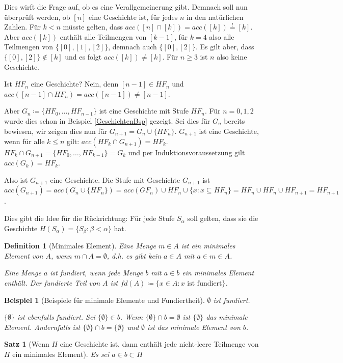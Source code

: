 \documentclass[german]{article}
\theoremstyle{break}
\newtheorem{example}{Beispiel}
\theoremstyle{def_style}
\newtheorem{definition}{Definition}
\theoremstyle{def_style}
\newtheorem{satz}{Satz}
\begin{document}
Dies wirft die Frage auf, ob es eine Verallgemeinerung gibt. Demnach soll nun überprüft werden, ob $[n]$ eine Geschichte ist, für jedes $n$ in den natürlichen Zahlen. Für $k<n$ müsste gelten, dass $acc([n]\cap[k])=acc([k])\stackrel{!}{=}[k]$. 
Aber $acc([k])$ enthält alle Teilmengen von $[k-1]$, für $k=4$ also alle Teilmengen von $\{[0],[1],[2]\}$, demnach auch $\{[0], [2]\}$. Es gilt aber, dass $\{[0],[2]\}\notin [k]$ und es folgt $acc([k])\neq[k]$. Für $n \geq 3$ ist $n$ also keine Geschichte.

Ist $HF_n$ eine Geschichte? Nein, denn $[n-1]\in HF_n$ und $acc([n-1]\cap HF_n)=acc([n-1])\neq[n-1]$.

Aber $G_n\coloneqq\{HF_0,\dots,HF_{n-1}\}$ ist eine Geschichte mit Stufe $HF_n$. Für $n=0,1,2$ wurde dies schon in Beispiel \ref{GeschichtenBsp} gezeigt. Sei dies für $G_n$ bereits bewiesen, wir zeigen dies nun für $G_{n+1}=G_n\cup\{HF_n\}$.
$G_{n+1}$ ist eine Geschichte, wenn für alle $k \leq n$ gilt: $acc(HF_k\cap G_{n+1})=HF_k$.
$HF_k \cap G_{n+1} = \{HF_0,\dots,HF_{k-1}\}=G_k$ und per Induktionsvoraussetzung gilt $acc(G_k)=HF_k$.

Also ist $G_{n+1}$ eine Geschichte. Die Stufe mit Geschichte $G_{n+1}$ ist $acc(G_{n+1})=acc(G_n\cup \{HF_n\})=acc(GF_n)\cup HF_n \cup \{x : x\subseteq HF_n\}=HF_n\cup HF_n \cup HF_{n+1} = HF_{n+1}$.

Dies gibt die Idee für die Rückrichtung: Für jede Stufe $S_\alpha$ soll gelten, dass sie die Geschichte $H(S_\alpha)=\{S_\beta : \beta < \alpha\}$ hat.

\begin{definition}[Minimales Element]
	Eine Menge $m\in A$ ist ein \textit{minimales Element} von $A$, wenn $m\cap A=\emptyset$, d.h. es gibt kein $a\in A$ mit $a\in m \in A$.
	
	Eine Menge $a$ ist fundiert, wenn jede Menge $b$ mit $a\in b$ ein minimales Element enthält. Der fundierte Teil von $A$ ist $fd(A)\coloneqq\{x\in A : x \text{ ist fundiert}\}$.
\end{definition}

\begin{example}[Beispiele für minimale Elemente und Fundiertheit]
	$\emptyset$ ist fundiert.
	
	$\{\emptyset\}$ ist ebenfalls fundiert. Sei $\{\emptyset\}\in b$. Wenn $\{\emptyset\}\cap b =\emptyset$ ist $\{\emptyset\}$ das minimale Element. Andernfalls ist $\{\emptyset\}\cap b=\{\emptyset\}$ und $\emptyset$ ist das minimale Element von $b$.
\end{example}

\begin{satz}[Wenn $H$ eine Geschichte ist, dann enthält jede nicht-leere Teilmenge von $H$ ein minimales Element]
	Es sei $a \in b \subset H$ 
\end{satz}
\end{document}
